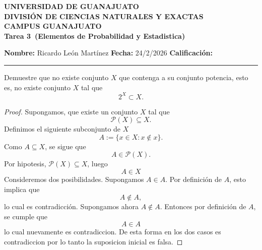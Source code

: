 \documentclass[12pt,a4paper]{article}
\newcommand{\alumno}{Ricardo León Martínez}
\newcommand{\materia}{Elementos de Probabilidad y Estadistica}
\newcommand{\tarea}{Tarea 3}
\newcommand{\fecha}{24/2/2026}
\begin{document}
    \begin{center}
        {\large\textbf{UNIVERSIDAD DE GUANAJUATO}}\\[0.3cm]
        {\normalsize\textbf{DIVISIÓN DE CIENCIAS NATURALES Y EXACTAS}}\\
        {\normalsize\textbf{CAMPUS GUANAJUATO}}\\[1cm]

        {\Large\textbf{\tarea\ (\materia)}}\\[1cm]
    \end{center}

    \noindent
    \textbf{Nombre:} \alumno 
    \hfill 
    \textbf{Fecha:} \fecha 
    \hfill 
    \textbf{Calificación:} \rule{3cm}{0.4pt}

    \vspace{0.3cm}

    \begin{mdframed}[style=mdbluebox,frametitle={Ejercicio 1}]
        Demuestre que no existe conjunto $X$ que contenga a su conjunto potencia, esto es, no existe conjunto $X$ tal que
        \begin{equation*}
            2^X \subset X.
        \end{equation*}
    \end{mdframed}

    \begin{proof}
        Supongamos, que existe un conjunto $X$ tal que
        \begin{equation*}
            \mathcal{P}(X)\subseteq X.
        \end{equation*}
        Definimos el siguiente subconjunto de $X$
        \begin{equation*}
            A:=\{x\in X:x\notin x\}.
        \end{equation*}
        Como $A\subseteq X$, se sigue que
        \begin{equation*}
            A\in\mathcal{P}(X).
        \end{equation*}
        Por hipotesis, $\mathcal{P}(X)\subseteq X$, luego
        \begin{equation*}
            A\in X
        \end{equation*}
        Consideremos dos posibilidades. Supongamos $A\in A$. Por definición de $A$, esto implica que
        \begin{equation*}
            A\notin A,
        \end{equation*}
        lo cual es contradicción. Supongamos ahora $A\notin A$. Entonces por definición de $A$, se cumple que 
        \begin{equation*}
            A\in A
        \end{equation*}
        lo cual nuevamente es contradiccion. De esta forma en los dos casos es contradiccion
        por lo tanto la suposicion inicial es falsa.
    \end{proof}
\end{document}
